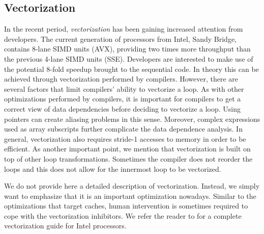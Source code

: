 \subsection{Vectorization}

In the recent period, \textit{vectorization} has been gaining increased
attention from developers. The current generation of processors from Intel,
Sandy Bridge, contains 8-lane SIMD units (AVX), providing two times more
throughput than the previous 4-lane SIMD units (SSE). Developers are interested
to make use of the potential 8-fold speedup brought to the sequential code. In
theory this can be achieved through vectorization performed by compilers.
However, there are several factors that limit compilers' ability to vectorize a
loop. As with other optimizations performed by compilers, it is important for
compilers to get a correct view of data dependencies before deciding to
vectorize a loop. Using pointers can create aliasing problems in this sense.
Moreover, complex expressions used as array subscripts further complicate the
data dependence analysis. In general, vectorization also requires stride-1
accesses to memory in order to be efficient. As another important point, we
mention that vectorization is built on top of other loop transformations.
Sometimes the compiler does not reorder the loops and this does not allow for
the innermost loop to be vectorized.

We do not provide here a detailed description of vectorization. Instead, we
simply want to emphasize that it is an important optimization nowadays. Similar
to the optimizations that target caches, human intervention is sometimes
required to cope with the vectorization inhibitors. We refer the reader to
\cite{vec_guide} for a complete vectorization guide for Intel processors.

